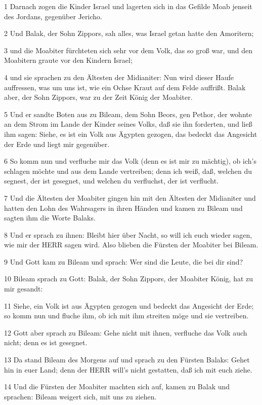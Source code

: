 \par 1 Darnach zogen die Kinder Israel und lagerten sich in das Gefilde Moab jenseit des Jordans, gegenüber Jericho.
\par 2 Und Balak, der Sohn Zippors, sah alles, was Israel getan hatte den Amoritern;
\par 3 und die Moabiter fürchteten sich sehr vor dem Volk, das so groß war, und den Moabitern graute vor den Kindern Israel;
\par 4 und sie sprachen zu den Ältesten der Midianiter: Nun wird dieser Haufe auffressen, was um uns ist, wie ein Ochse Kraut auf dem Felde auffrißt. Balak aber, der Sohn Zippors, war zu der Zeit König der Moabiter.
\par 5 Und er sandte Boten aus zu Bileam, dem Sohn Beors, gen Pethor, der wohnte an dem Strom im Lande der Kinder seines Volks, daß sie ihn forderten, und ließ ihm sagen: Siehe, es ist ein Volk aus Ägypten gezogen, das bedeckt das Angesicht der Erde und liegt mir gegenüber.
\par 6 So komm nun und verfluche mir das Volk (denn es ist mir zu mächtig), ob ich's schlagen möchte und aus dem Lande vertreiben; denn ich weiß, daß, welchen du segnest, der ist gesegnet, und welchen du verfluchst, der ist verflucht.
\par 7 Und die Ältesten der Moabiter gingen hin mit den Ältesten der Midianiter und hatten den Lohn des Wahrsagers in ihren Händen und kamen zu Bileam und sagten ihm die Worte Balaks.
\par 8 Und er sprach zu ihnen: Bleibt hier über Nacht, so will ich euch wieder sagen, wie mir der HERR sagen wird. Also blieben die Fürsten der Moabiter bei Bileam.
\par 9 Und Gott kam zu Bileam und sprach: Wer sind die Leute, die bei dir sind?
\par 10 Bileam sprach zu Gott: Balak, der Sohn Zippors, der Moabiter König, hat zu mir gesandt:
\par 11 Siehe, ein Volk ist aus Ägypten gezogen und bedeckt das Angesicht der Erde; so komm nun und fluche ihm, ob ich mit ihm streiten möge und sie vertreiben.
\par 12 Gott aber sprach zu Bileam: Gehe nicht mit ihnen, verfluche das Volk auch nicht; denn es ist gesegnet.
\par 13 Da stand Bileam des Morgens auf und sprach zu den Fürsten Balaks: Gehet hin in euer Land; denn der HERR will's nicht gestatten, daß ich mit euch ziehe.
\par 14 Und die Fürsten der Moabiter machten sich auf, kamen zu Balak und sprachen: Bileam weigert sich, mit uns zu ziehen.
